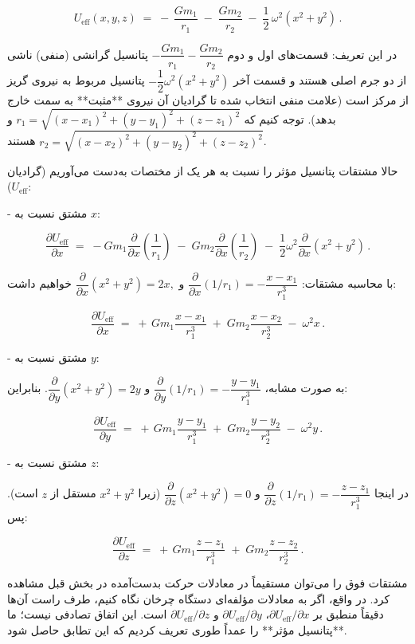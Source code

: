 \[ 
U_{\text{eff}}(x,y,z) \;=\; -\,\dfrac{G m_1}{r_1}\;-\;\dfrac{G m_2}{r_2}\;-\;\dfrac{1}{2}\,\omega^2 (x^2 + y^2)\,. 
\]

در این تعریف: قسمت‌های اول و دوم \(-\dfrac{G m_1}{r_1} - \dfrac{G m_2}{r_2}\) پتانسیل گرانشی (منفی) ناشی از دو جرم اصلی هستند و قسمت آخر \(-\dfrac{1}{2}\omega^2(x^2+y^2)\) پتانسیل مربوط به نیروی گریز از مرکز است (علامت منفی انتخاب شده تا گرادیان آن نیروی **مثبت** به سمت خارج بدهد). توجه کنیم که \(r_1 = \sqrt{(x-x_1)^2+(y-y_1)^2+(z-z_1)^2}\) و \(r_2 = \sqrt{(x-x_2)^2+(y-y_2)^2+(z-z_2)^2}\) هستند.

حالا مشتقات پتانسیل مؤثر را نسبت به هر یک از مختصات به‌دست می‌آوریم (گرادیان \(U_{\text{eff}}\)): 

- مشتق نسبت به \(x\): 

\[
\dfrac{\partial U_{\text{eff}}}{\partial x} \;=\; -G m_1 \dfrac{\partial}{\partial x}\left(\dfrac{1}{r_1}\right)\;-\;G m_2 \dfrac{\partial}{\partial x}\left(\dfrac{1}{r_2}\right)\;-\;\dfrac{1}{2}\omega^2 \dfrac{\partial}{\partial x}(x^2+y^2)\,. 
\] 

با محاسبه مشتقات:\; \( \dfrac{\partial}{\partial x}(1/r_1) = -\dfrac{x-x_1}{r_1^3} \) و \( \dfrac{\partial}{\partial x}(x^2+y^2) = 2x,\) خواهیم داشت: 

\[
\dfrac{\partial U_{\text{eff}}}{\partial x} \;=\; +\,G m_1 \dfrac{x - x_1}{r_1^3}\;+\;G m_2 \dfrac{x - x_2}{r_2^3}\;-\;\omega^2 x\,.
\] 

- مشتق نسبت به \(y\): 

به صورت مشابه، \( \dfrac{\partial}{\partial y}(1/r_1) = -\dfrac{y-y_1}{r_1^3}\) و \( \dfrac{\partial}{\partial y}(x^2+y^2) = 2y \). بنابراین: 

\[
\dfrac{\partial U_{\text{eff}}}{\partial y} \;=\; +\,G m_1 \dfrac{y - y_1}{r_1^3}\;+\;G m_2 \dfrac{y - y_2}{r_2^3}\;-\;\omega^2 y\,.
\] 

- مشتق نسبت به \(z\): 

در اینجا \( \dfrac{\partial}{\partial z}(1/r_1) = -\dfrac{z-z_1}{r_1^3}\) و \( \dfrac{\partial}{\partial z}(x^2+y^2) = 0\) (زیرا \(x^2+y^2\) مستقل از \(z\) است). پس: 

\[
\dfrac{\partial U_{\text{eff}}}{\partial z} \;=\; +\,G m_1 \dfrac{z - z_1}{r_1^3}\;+\;G m_2 \dfrac{z - z_2}{r_2^3}\,. 
\] 

مشتقات فوق را می‌توان مستقیماً در معادلات حرکت بدست‌آمده در بخش قبل مشاهده کرد. در واقع، اگر به معادلات مؤلفه‌ای دستگاه چرخان نگاه کنیم، طرف راست آن‌ها دقیقاً منطبق بر \(\partial U_{\text{eff}}/\partial x\)، \(\partial U_{\text{eff}}/\partial y\) و \(\partial U_{\text{eff}}/\partial z\) است. این اتفاق تصادفی نیست؛ ما **پتانسیل مؤثر** را عمداً طوری تعریف کردیم که این تطابق حاصل شود. 

